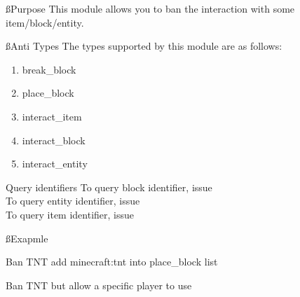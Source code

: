 
\ss{Purpose}
This module allows you to ban the interaction with some item/block/entity.

\ss{Anti Types}
The types supported by this module are as follows:
\begin{enumerate}
    \item break\_block
    \item place\_block
    \item interact\_item
    \item interact\_block
    \item interact\_entity
\end{enumerate}

\begin{tips}{Query identifiers}
    To query block identifier, issue \\
    To query entity identifier, issue \\
    To query item identifier, issue 
\end{tips}

\ss{Exapmle}
\begin{example}{Ban TNT}
    add minecraft:tnt into place\_block list
\end{example}

\begin{example}{Ban TNT but allow a specific player to use}
\end{example}


